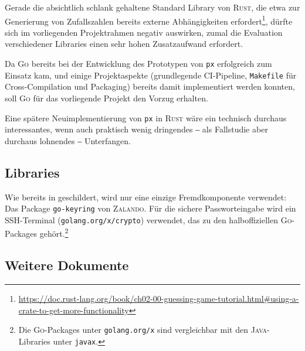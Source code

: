 Gerade die absichtlich schlank gehaltene Standard Library von \textsc{Rust}, die etwa zur Generierung von Zufallszahlen bereits externe Abhängigkeiten erfordert\footnote{\url{https://doc.rust-lang.org/book/ch02-00-guessing-game-tutorial.html\#using-a-crate-to-get-more-functionality}}, dürfte sich im vorliegenden Projektrahmen negativ auswirken, zumal die Evaluation verschiedener Libraries einen sehr hohen Zusatzaufwand erfordert.

Da \textsc{Go} bereits bei der Entwicklung des Prototypen von \texttt{px} erfolgreich zum Einsatz kam, und einige Projektaspekte (grundlegende CI-Pipeline, \texttt{Makefile} für Cross-Compilation und Packaging) bereits damit implementiert werden konnten, soll \textsc{Go} für das vorliegende Projekt den Vorzug erhalten.

Eine spätere Neuimplementierung von \texttt{px} in \textsc{Rust} wäre ein technisch durchaus interessantes, wenn auch praktisch wenig dringendes ‒ als Fallstudie aber durchaus lohnendes ‒ Unterfangen.

\subsection{Libraries}

Wie bereits in  geschildert, wird nur eine einzige Fremdkomponente verwendet: Das Package \texttt{go-keyring} von \textsc{Zalando}. Für die sichere Passworteingabe wird ein SSH-Terminal (\texttt{golang.org/x/crypto}) verwendet, das zu den halboffiziellen \textsc{Go}-Packages gehört.\footnote{Die \textsc{Go}-Packages unter \texttt{golang.org/x} sind vergleichbar mit den \textsc{Java}-Libraries unter \texttt{javax}.}

\subsection{Weitere Dokumente}
\label{apx:WeitereDokumente}

